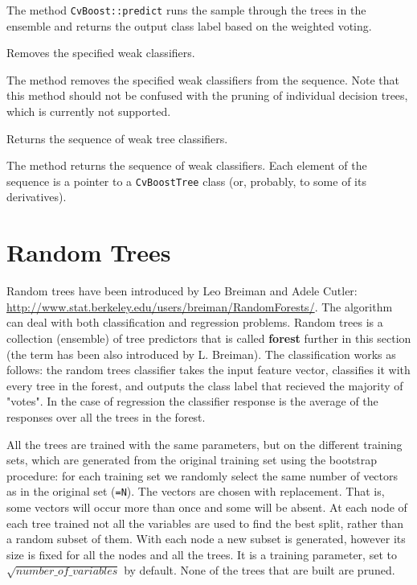 The method \texttt{CvBoost::predict} runs the sample through the trees in the ensemble and returns the output class label based on the weighted voting.


Removes the specified weak classifiers.


The method removes the specified weak classifiers from the sequence. Note that this method should not be confused with the pruning of individual decision trees, which is currently not supported.


Returns the sequence of weak tree classifiers.


The method returns the sequence of weak classifiers. Each element of the sequence is a pointer to a \texttt{CvBoostTree} class (or, probably, to some of its derivatives).

\section{Random Trees}


Random trees have been introduced by Leo Breiman and Adele Cutler: \url{http://www.stat.berkeley.edu/users/breiman/RandomForests/}. The algorithm can deal with both classification and regression problems. Random trees is a collection (ensemble) of tree predictors that is called \textbf{forest} further in this section (the term has been also introduced by L. Breiman). The classification works as follows: the random trees classifier takes the input feature vector, classifies it with every tree in the forest, and outputs the class label that recieved the majority of "votes". In the case of regression the classifier response is the average of the responses over all the trees in the forest.

All the trees are trained with the same parameters, but on the different training sets, which are generated from the original training set using the bootstrap procedure: for each training set we randomly select the same number of vectors as in the original set (\texttt{=N}). The vectors are chosen with replacement. That is, some vectors will occur more than once and some will be absent. At each node of each tree trained not all the variables are used to find the best split, rather than a random subset of them. With each node a new subset is generated, however its size is fixed for all the nodes and all the trees. It is a training parameter, set to $\sqrt{number\_of\_variables}$ by default. None of the trees that are built are pruned.

